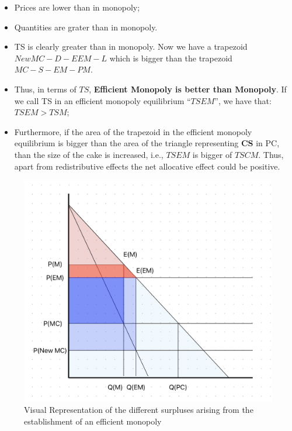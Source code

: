             \begin{itemize}
                \item Prices are lower than in monopoly; 
                \item Quantities are grater than in monopoly.
                \item TS is clearly greater than in monopoly. Now we have a trapezoid $NewMC-D-EEM-L$ which is bigger than the trapezoid $MC-S-EM-PM$.
                \item Thus, in terms of $TS$, \textbf{Efficient Monopoly is better than Monopoly}. If we call TS in an efficient monopoly equilibrium “$TSEM$”, we have that: $TSEM > TSM$;
                \item Furthermore, if the area of the trapezoid in the efficient monopoly equilibrium is bigger than the area of the triangle representing \textcolor{BrickRed}{\textbf{CS}} in PC, than the size of the cake is increased, i.e., $TSEM$ is bigger of $TSCM$. Thus, apart from redistributive effects the net allocative effect could be positive.
            \end{itemize}

            \begin{figure}[h]
                \centering
                \includegraphics[width=0.66\linewidth]{graphics/EfficientMonopoly.png}
                \caption{Visual Representation of the different surpluses arising from the establishment of an efficient monopoly}
                \label{fig:efficient_monopoly}
            \end{figure}

